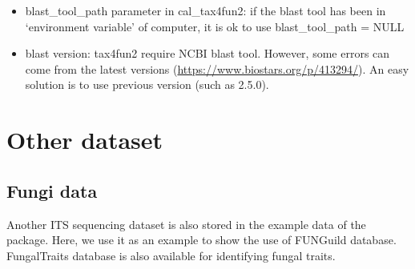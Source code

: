 \documentclass[
]{book}
\providecommand{\tightlist}{%
  \setlength{\itemsep}{0pt}\setlength{\parskip}{0pt}}
\begin{document}
\begin{itemize}
\tightlist
\item
  blast\_tool\_path parameter in cal\_tax4fun2: if the blast tool has been in `environment variable' of computer, it is ok to use blast\_tool\_path = NULL
\item
  blast version: tax4fun2 require NCBI blast tool. However, some errors can come from the latest versions (\url{https://www.biostars.org/p/413294/}). An easy solution is to use previous version (such as 2.5.0).
\end{itemize}

\hypertarget{other-dataset}{%
\chapter{Other dataset}\label{other-dataset}}

\hypertarget{fungi-data}{%
\section{Fungi data}\label{fungi-data}}

Another ITS sequencing dataset \citep{Gao_Strong_2019} is also stored in the example data of the package.
Here, we use it as an example to show the use of FUNGuild database\citep{Nguyen_FUNGuild_2016}.
FungalTraits \citep{Polme_FungalTraits_2020} database is also available for identifying fungal traits.
\end{document}
